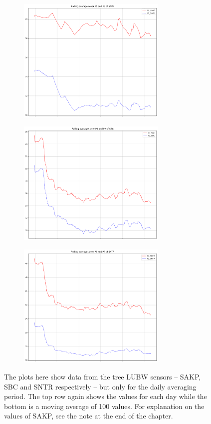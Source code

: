 \documentclass[12pt,a4paper,twoside]{scrartcl}
\numberwithin{equation}{section}
\begin{document}
\begin{figure}[H]
  \begin{subfigure}[t]{0.32\textwidth}
    \includegraphics[width=\textwidth,height=6cm]{figures/1D_SAKP_rolling_plot_}%
    \caption{}
  \end{subfigure}
  \begin{subfigure}[t]{0.32\textwidth}
    \includegraphics[width=\textwidth,height=6cm]{figures/1D_SBC_rolling_plot_}%
    \caption{}
  \end{subfigure}
  \begin{subfigure}[t]{0.32\textwidth}
    \includegraphics[width=\textwidth,height=6cm]{figures/1D_SNTR_rolling_plot_}%
    \subcaption{}
  \end{subfigure}      
  \caption[LUBW Data Plots]{The plots here show data from the tree LUBW sensors -- SAKP, SBC and SNTR respectively -- but only for the daily averaging period. The top row again shows the values for each day while the bottom is a moving average of 100 values. For explanation on the values of SAKP, see the note at the end of the chapter.}\label{fig:lubw-plots}
\end{figure}
\end{document}
